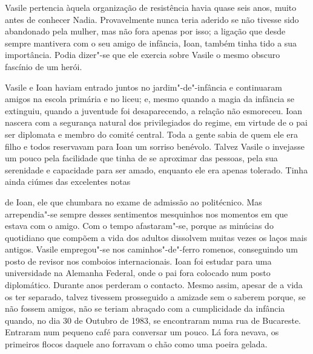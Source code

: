 \bigskip

Vasile pertencia àquela organização de resistência havia quase seis
anos, muito antes de conhecer Nadia. Provavelmente nunca teria aderido
se não tivesse sido abandonado pela mulher, mas não fora apenas por
isso; a ligação que desde sempre mantivera com o seu amigo de infância,
Ioan, também tinha tido a sua importância. Podia dizer"-se que ele
exercia sobre Vasile o mesmo obscuro fascínio de um herói.

Vasile e Ioan haviam entrado juntos no jardim"-de"-infância e continuaram amigos na escola primária e no liceu; e, mesmo
quando a magia da infância se extinguiu, quando a juventude foi
desaparecendo, a relação não esmoreceu. Ioan nascera com a segurança
natural dos privilegiados do regime, em virtude de o pai ser diplomata e
membro do comité central. Toda a gente sabia de quem ele era filho e
todos reservavam para Ioan um sorriso benévolo. Talvez Vasile o
invejasse um pouco pela facilidade que tinha de se aproximar das
pessoas, pela sua serenidade e capacidade para ser amado, enquanto ele
era apenas tolerado. Tinha ainda ciúmes das excelentes notas

de Ioan, ele que chumbara no exame de admissão ao politécnico. Mas
arrependia"-se sempre desses sentimentos mesquinhos nos momentos em que
estava com o amigo. Com o tempo afastaram"-se, porque as minúcias do
quotidiano que compõem a vida dos adultos dissolvem muitas vezes os
laços mais antigos. Vasile empregou"-se nos caminhos"-de"-ferro romenos,
conseguindo um posto de revisor nos comboios internacionais. Ioan foi
estudar para uma universidade na Alemanha Federal, onde o pai fora
colocado num posto diplomático. Durante anos perderam o contacto. Mesmo
assim, apesar de a vida os ter separado, talvez tivessem prosseguido a
amizade sem o saberem porque, se não fossem amigos, não se teriam
abraçado com a cumplicidade da infância quando, no dia 30 de Outubro de
1983, se encontraram numa rua de Bucareste. Entraram num pequeno café
para conversar um pouco. Lá fora nevava, os primeiros flocos daquele ano
forravam o chão como uma poeira gelada.

